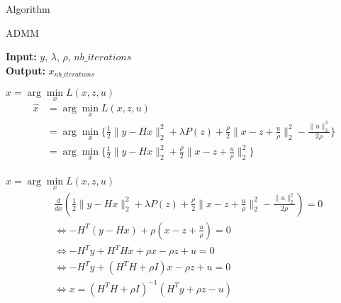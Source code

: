\begin{frame}{Algorithm}

\begin{algorithm}[H]
    \caption{ADMM} %
    \begin{algorithmic}[1]
        \newline
        \textbf{Input:} $y$, $\lambda$, $\rho$, $nb\_iterations$ \\
        \textbf{Output:} $x_{nb\_iterations}$
        \EndFor
        \EndProcedure
    \end{algorithmic}
\end{algorithm}
\end{frame}

\begin{frame}{$\hat x = \arg\min\limits_{x} {L(x, z, u)}$}
    \begin{align*}
        \hat x
        &= \arg\min\limits_{x} L(x, z, u) \\
        &= \arg\min\limits_{x} \{
            \frac{1}{2} \lVert y - Hx \rVert_{2}^{2} + \lambda P(z) +
            \frac{\rho}{2} \lVert x-z+\frac{u}{\rho} \rVert_{2}^{2} 
            - \frac{\lVert u \rVert_{2}^{2}}{2\rho}
        \} \\
        &= \arg\min\limits_{x} \{
            \frac{1}{2} \lVert y - Hx \rVert_{2}^{2} +
            \frac{\rho}{2} \lVert x-z+\frac{u}{\rho} \rVert_{2}^{2}
        \} \\
    \end{align*}
\end{frame}

\begin{frame}{$\hat x = \arg\min\limits_{x} {L(x, z, u)}$}
    \begin{align*}
        &\frac{d}{dx} (\frac{1}{2} \lVert y - Hx \rVert_{2}^{2} + \lambda P(z) +
        \frac{\rho}{2} \lVert x-z+\frac{u}{\rho} \rVert_{2}^{2} 
        - \frac{\lVert u \rVert_{2}^{2}}{2\rho}) = 0 \\
        &\iff -H^{T} (y - Hx) + \rho (x-z+\frac{u}{\rho}) = 0 \\
        &\iff -H^{T}y + H^{T}Hx + \rho x - \rho z+ u = 0 \\
        &\iff -H^{T}y + (H^{T}H + \rho I)x - \rho z+ u = 0 \\
        &\iff  x = (H^{T}H + \rho I)^{-1} (H^{T}y + \rho z - u) \\
    \end{align*}
\end{frame}

